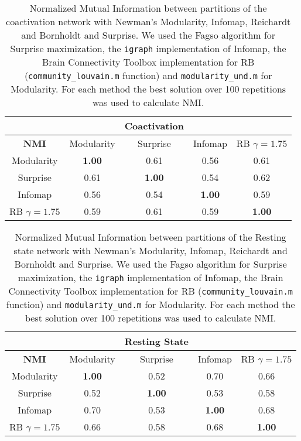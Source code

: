 \begin{table}
\centering
\begin{tabular}{ccccc}
& & \textbf{Coactivation} & \\
\hline 
\textbf{NMI} &Modularity & Surprise & Infomap & RB $\gamma=1.75$ \\
\hline
Modularity 			& \textbf{1.00} & 0.61 & 0.56 & 0.61 \\
Surprise 			& 0.61 & \textbf{1.00} & 0.54 & 0.62 \\
Infomap 			& 0.56 & 0.54 & \textbf{1.00} & 0.59 \\
RB $\gamma=1.75$ 	& 0.59 & 0.61 & 0.59 & \textbf{1.00} \\ \hline 
\end{tabular}
\caption{Normalized Mutual Information between partitions of the coactivation network with Newman's Modularity, Infomap, Reichardt and Bornholdt and Surprise.
We used the Fagso algorithm for Surprise maximization, the \texttt{igraph} implementation of Infomap, the Brain Connectivity Toolbox implementation for RB (\texttt{community\_louvain.m} function) and \texttt{modularity\_und.m} for Modularity.
For each method the best solution over 100 repetitions was used to calculate NMI.}
\end{table}

\begin{table}
\centering
\begin{tabular}{ccccc}
& & \textbf{Resting State} & \\
\hline 
\textbf{NMI} &Modularity & Surprise & Infomap & RB $\gamma=1.75$ \\
\hline
Modularity & \textbf{1.00} & 0.52 &  0.70 & 0.66 \\
Surprise & 0.52 & \textbf{1.00} & 0.53 & 0.58 \\
Infomap & 0.70 & 0.53 & \textbf{1.00} & 0.68 \\
RB $\gamma=1.75$ & 0.66 & 0.58 & 0.68 & \textbf{1.00} \\ \hline 
\end{tabular}
\caption{Normalized Mutual Information between partitions of the Resting state network with Newman's Modularity, Infomap, Reichardt and Bornholdt and Surprise.
We used the Fagso algorithm for Surprise maximization, the \texttt{igraph} implementation of Infomap, the Brain Connectivity Toolbox implementation for RB (\texttt{community\_louvain.m} function) and \texttt{modularity\_und.m} for Modularity.
For each method the best solution over 100 repetitions was used to calculate NMI.}
\end{table}

